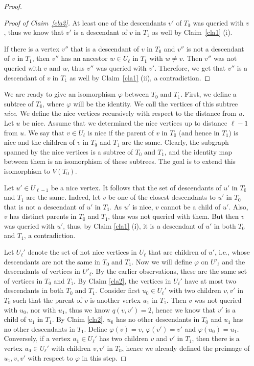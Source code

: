\documentclass[10pt,a4paper]{amsart}
\begin{document}
\begin{proof}
\begin{proof}[Proof of Claim~\ref{cla2}] 
At least one of the descendants $v'$ of $T_0$ was queried with $v$, thus we know that $v'$ is a descendant of $v$ in $T_1$ as well by Claim~\ref{cla1} (i).

If there is a vertex $v''$ that is a descendant of $v$ in $T_0$ and $v''$ is not a descendant of $v$ in $T_1$, then $v''$ has an ancestor $w\in U_\ell$ in $T_1$ with $w\neq v$. Then $v''$ was not queried with $v$ and $w$, thus $v''$ was queried with $v'$.
Therefore, we get that $v''$ is a descendant of $v$ in $T_1$ as well by Claim~\ref{cla1} (ii), a contradiction.
\end{proof}


We are ready to give an isomorphism $\varphi$ between $T_0$ and $T_1$. First, we define a subtree of $T_0$, where $\varphi$ will be the identity. We call the vertices of this subtree \emph{nice}. We define the nice vertices recursively with respect to the distance from $u$. Let $u$ be nice. Assume that we determined the nice vertices up to distance $\ell-1$ from $u$. We say that $v \in U_\ell$ is nice if the parent of $v$ in $T_0$ (and hence in $T_1$) is nice and the children of $v$ in $T_0$ and $T_1$ are the same. Clearly, the subgraph spanned by the nice vertices is a subtree of $T_0$ and $T_1$, and the identity map between them is an isomorphism of these subtrees. 
The goal is to extend this isomorphism to $V(T_0)$. 

Let $u'\in U_{\ell-1}$ be a nice vertex. It follows that the set of descendants of $u'$ in $T_0$ and $T_1$ are the same. Indeed, let $v$ be one of the closest descendants to $u'$ in $T_0$ that is not a descendant of $u'$ in $T_1$. As $u'$ is nice, $v$ cannot be a child of $u'$. Also, $v$ has distinct parents in $T_0$ and $T_1$, thus was not queried with them. But then $v$ was queried with $u'$, thus, by Claim \ref{cla1} (i), it is a descendant of $u'$ in both $T_0$ and $T_1$, a contradiction. 

Let $U_{\ell}'$ denote the set of not nice vertices in $U_\ell$ that are children of $u'$, i.e., whose descendants are not the same in $T_0$ and $T_1$. Now we will define $\varphi$ on $U'_\ell$ and the descendants of vertices in $U'_\ell$. By the earlier observations, these are the same set of vertices in $T_0$ and $T_1$. By Claim \ref{cla2}, the vertices in $U_{\ell}'$ have at most two descendants in both $T_0$ and $T_1$.
Consider first $u_0\in U_\ell'$ with two children $v,v'$ in $T_0$ such that the parent of $v$ is another vertex $u_1$ in $T_1$. Then $v$ was not queried with $u_0$, nor with $u_1$, thus we know $q(v,v')=2$, hence we know that $v'$ is a child of $u_1$ in $T_1$. By Claim \ref{cla2}, $u_0$ has no other descendants in $T_0$ and $u_1$ has no other descendants in $T_1$. Define $\varphi(v)=v$, $\varphi(v')=v'$ and $\varphi(u_0)=u_1$.
Conversely, if a vertex $u_1 \in U_{\ell}'$ has two children $v$ and $v'$ in $T_1$, then there is a vertex $u_0 \in U_{\ell}'$ with children $v, v'$ in $T_0$, hence we already defined the preimage of $u_1, v, v'$ with respect to $\varphi$ in this step.


\end{proof}
\end{document}
